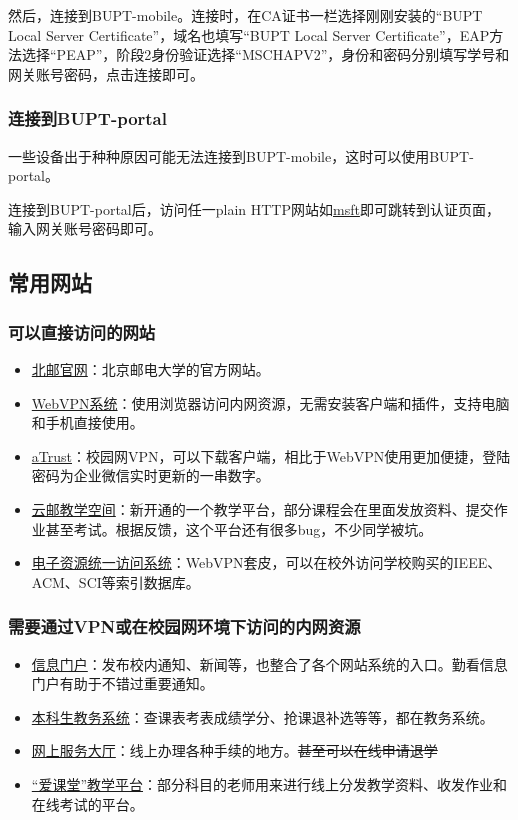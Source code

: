 然后，连接到BUPT-mobile。连接时，在CA证书一栏选择刚刚安装的“BUPT Local Server Certificate”，域名也填写“BUPT Local Server Certificate”，EAP方法选择“PEAP”，阶段2身份验证选择“MSCHAPV2”，身份和密码分别填写学号和网关账号密码，点击连接即可。

\subsubsection*{连接到BUPT-portal}

一些设备出于种种原因可能无法连接到BUPT-mobile，这时可以使用BUPT-portal。

连接到BUPT-portal后，访问任一plain HTTP网站如\href{http://www.msftconnecttest.com/redirect}{msft}即可跳转到认证页面，输入网关账号密码即可。

\subsection{常用网站}

\subsubsection*{可以直接访问的网站}
\begin{itemize}
    \item \href{https://www.bupt.edu.cn/}{北邮官网}：北京邮电大学的官方网站。
    \item \href{https://webvpn.bupt.edu.cn/}{WebVPN系统}：使用浏览器访问内网资源，无需安装客户端和插件，支持电脑和手机直接使用。
    \item \href{https://vpn.bupt.edu.cn/}{aTrust}：校园网VPN，可以下载客户端，相比于WebVPN使用更加便捷，登陆密码为企业微信实时更新的一串数字。
    \item \href{https://ucloud.bupt.edu.cn/}{云邮教学空间}：新开通的一个教学平台，部分课程会在里面发放资料、提交作业甚至考试。根据反馈，这个平台还有很多bug，不少同学被坑。
    \item \href{https://libcon.bupt.edu.cn/}{电子资源统一访问系统}：WebVPN套皮，可以在校外访问学校购买的IEEE、ACM、SCI等索引数据库。
\end{itemize}

\subsubsection*{需要通过VPN或在校园网环境下访问的内网资源}
\begin{itemize}
    \item \href{http://my.bupt.edu.cn/}{信息门户}：发布校内通知、新闻等，也整合了各个网站系统的入口。勤看信息门户有助于不错过重要通知。
    \item \href{https://jwgl.bupt.edu.cn/}{本科生教务系统}：查课表考表成绩学分、抢课退补选等等，都在教务系统。
    \item \href{https://service.bupt.edu.cn/}{网上服务大厅}：线上办理各种手续的地方。\sout{甚至可以在线申请退学}
    \item \href{https://iclass.bupt.edu.cn/}{“爱课堂”教学平台}：部分科目的老师用来进行线上分发教学资料、收发作业和在线考试的平台。
\end{itemize}

